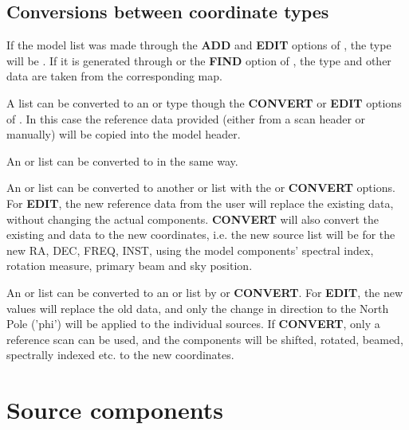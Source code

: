 \subsection{ Conversions between coordinate types}
\label{.coord.conversions}

	If the model list was made through the {\bf ADD} and {\bf EDIT}
options of \NMODEL, the type will be \local.  If it is generated through
 or the {\bf FIND} option of \NMODEL, the
type and other data are taken from the corresponding map. 

	A \local list can be converted to an \apparent or \epoch type
though the {\bf CONVERT} or {\bf EDIT} options of \NMODEL.  In this case
the reference data provided (either from a scan header or manually) will
be copied into the model header. 

	An \apparent or \epoch list can be converted to \local in the
same way. 

	An \apparent or \epoch list can be converted to another
\apparent or \epoch list with the  or {\bf CONVERT}
options.  For {\bf EDIT}, the new reference data from the user will
replace the existing \header data, without changing the actual \source
components.  {\bf CONVERT} will also convert the existing \source and
\header data to the new coordinates, i.e.  the new source list will be
for the new RA, DEC, FREQ, INST, using the model components' spectral
index, rotation measure, primary beam and sky position. 

	An \apparent or \epoch list can be converted to an \epoch or
\apparent list by  or {\bf CONVERT}.  For {\bf EDIT},
the new values will replace the old \header data, and only the change in
direction to the North Pole ('phi') will be applied to the individual
sources.  If {\bf CONVERT}, only a reference scan can be used, and the
\source components will be shifted, rotated, beamed, spectrally indexed
etc.  to the new coordinates. 


\section{ Source components}
\label{.source.components}

